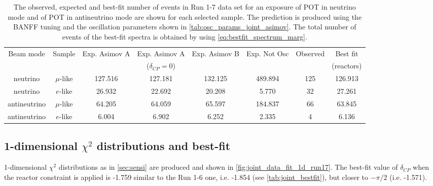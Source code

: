 \begin{table}[htb]
\centering
\begin{tabular}{| c | c | c | c | c | c | c | c |}
\hline
Beam mode	& Sample		& Exp. Asimov A  	& Exp. Asimov A	& Exp. Asimov B	& Exp. Not Osc			& Observed 	& Best fit\\
			& 			& 			  	& ($\delta_{CP}=0$)	& 				& 					& 		 	& (reactors) \\
\hline
neutrino	 	& $\mu$-like 	&127.516			& 127.181			& 132.125	 		& 489.894				& 125 		& 126.913 \\
neutrino 		& $e$-like  	& 26.932 			& 22.692			& 20.208			& 5.770				& 32 			& 27.261 \\
antineutrino 	& $\mu$-like 	& 64.205			& 64.059			& 65.597			& 184.837				& 66 			& 63.845 \\
antineutrino 	& $e$-like 	& 6.004			& 6.902			& 6.252			& 2.335				& 4 			& 6.136 \\
\hline
\end{tabular}
\caption{
The observed, expected and best-fit number of events in Run 1-7 data set
for an exposure
of \TotalPotNuRunOneSeven POT in neutrino mode
and
of \TotalPotNuBarRunOneSeven POT in antineutrino mode
are shown 
for each selected sample.
The prediction is produced using the BANFF tuning
and the oscillation parameters shown in \cref{tab:osc_params_joint_asimov}.
The total number of events of the best-fit spectra is obtained by using \cref{eq:bestfit_spectrum_marg}.
}
\label{tab:num_events_run17}
\end{table}













%
%

\subsection {1-dimensional $\chi^2$ distributions and best-fit}
\label{sec:chisq_1d_run17}



1-dimensional $\chi^2$ distributions as in \cref{sec:sensi} are produced
and shown in \cref{fig:joint_data_fit_1d_run17}.
The best-fit value of $\delta_{CP}$ when the reactor constraint is applied is -1.759
similar to the Run 1-6 one, i.e. -1.854 (see \cref{tab:joint_bestfit}), but closer to $-\pi/2$ (i.e. -1.571).
 

